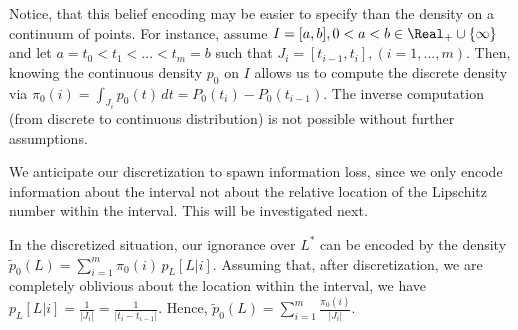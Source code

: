 \begin{rem}
Notice, that this belief encoding may be easier to specify than the density on a continuum of points. 
For instance, assume $I = [a,b] , 0<a<b \in \Real_+ \cup \{\infty\}$ and let $a=t_0<t_1<...<t_m =b$ such that $J_i = [t_{i-1},t_i], (i=1,...,m)$.
Then, knowing the continuous density $p_0$ on $I$ allows us to compute the discrete density via $ \pi_0 (i) = \int_{J_i} p_0(t) \,dt=P_0 (t_i) - P_0(t_{i-1})$. The inverse computation (from discrete to continuous distribution) is not possible without further assumptions.
\end{rem}

We anticipate our discretization to spawn information loss, since we only encode information about the interval not about the relative location of the Lipschitz number within the interval. This will be investigated next.

%
%
%
%

In the discretized situation, our ignorance over $L^*$ can be encoded by the density  $\tilde p_0(L) =  \sum_{i=1}^m \pi_0(i) \, p_L [L| i ]$. Assuming that, after discretization, we are completely oblivious about the location within the interval, we have $p_L [L | i ] = \frac{1}{| J_i |} =\frac{1}{| t_i-t_{i-1} |}$.
Hence, $\tilde p_0(L)  =  \sum_{i=1}^m  \frac{\pi_0(i)}{| J_i |} $. 

